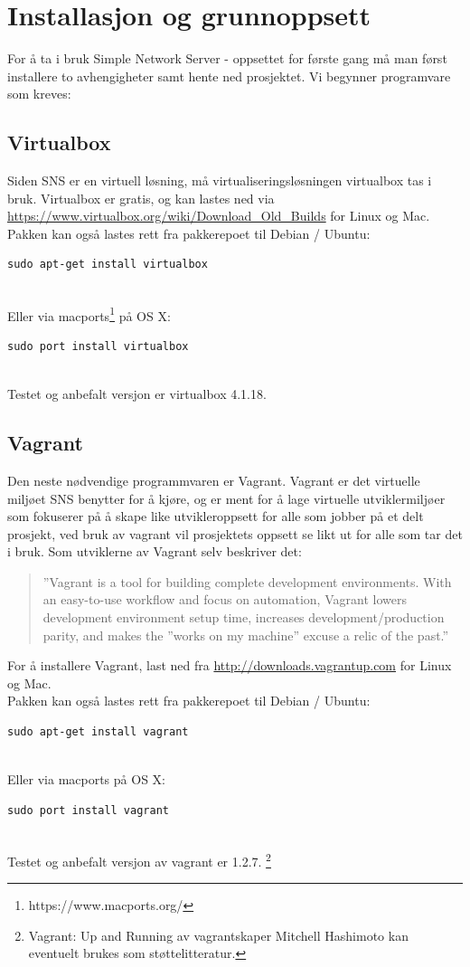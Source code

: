 \documentclass{article}
\begin{document}
\section{Installasjon og grunnoppsett}
For å ta i bruk Simple Network Server - oppsettet for første gang må man først installere to avhengigheter samt hente ned prosjektet. Vi begynner programvare som kreves:
\subsection{Virtualbox}
Siden SNS er en virtuell løsning, må virtualiseringsløsningen virtualbox tas i bruk. Virtualbox er gratis, og kan lastes ned via \url{https://www.virtualbox.org/wiki/Download_Old_Builds} for Linux og Mac. Pakken kan også lastes rett fra pakkerepoet til Debian / Ubuntu: \\ 
\begin{lstlisting}
sudo apt-get install virtualbox
\end{lstlisting}
\\
Eller via macports\footnote{https://www.macports.org/} på OS X:
\begin{lstlisting}
sudo port install virtualbox
\end{lstlisting}
\\
Testet og anbefalt versjon er virtualbox 4.1.18. 
\subsection{Vagrant}
Den neste nødvendige programmvaren er Vagrant. Vagrant er det virtuelle miljøet SNS benytter for å kjøre, og er ment for å lage virtuelle utviklermiljøer som fokuserer på å skape like utvikleroppsett for alle som jobber på et delt prosjekt, ved bruk av vagrant vil prosjektets oppsett se likt ut for alle som tar det i bruk. Som utviklerne av Vagrant selv beskriver det: 
\begin{quote}
''Vagrant is a tool for building complete development environments. With an easy-to-use workflow and focus on automation, Vagrant lowers development environment setup time, increases development/production parity, and makes the ''works on my machine'' excuse a relic of the past.''
\end{quote}
For å installere Vagrant, last ned fra \url{http://downloads.vagrantup.com} for Linux og Mac. \\
 Pakken kan også lastes rett fra pakkerepoet til Debian / Ubuntu: \\ 
\begin{lstlisting}
sudo apt-get install vagrant
\end{lstlisting}
\\
Eller via macports på OS X:
\begin{lstlisting}
sudo port install vagrant
\end{lstlisting}
\\
Testet og anbefalt versjon av vagrant er 1.2.7. 
\footnote{Vagrant: Up and Running av vagrantskaper Mitchell Hashimoto kan eventuelt brukes som støttelitteratur. }
\end{document}
